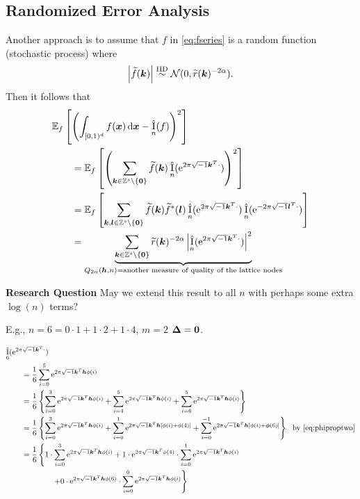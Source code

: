 \documentclass{amsart}
\newcommand{\tr}{\widetilde{r}}
\newcommand{\appxintn}{\appxint_n}
\DeclareMathOperator{\appxint}{\hat{I}}
\begin{document}
\subsection{Randomized Error Analysis}
Another approach is to assume that $f$ in \eqref{eq:fseries} is a random function (stochastic process) where
\begin{equation}
    \abs{\tf(\vk)} \IIDsim \cn(0,\tr(\vk)^{-2\alpha}).
\end{equation}
Then it follows that
\begin{align*}
    \MoveEqLeft{\Ex_f\left[\left(\int_{[0,1)^d} f(\vx) \, \dif \vx - \appxintn(f) \right)^2\right]} \\
    & =
    \Ex_f\left[\left(\sum_{\vk \in \integers^s \setminus\{\vzero\}} \tf(\vk) \appxintn(\me^{2 \pi \sqrt{-1} \vk^T \cdot})\right)^2\right] \\
     & =
    \Ex_f\left[\sum_{\vk,\vl \in \integers^s \setminus\{\vzero\}} \tf(\vk) \tf^*(\vl) \appxintn(\me^{2 \pi \sqrt{-1} \vk^T \cdot}) \appxintn(\me^{-2 \pi \sqrt{-1} \vl^T \cdot})\right] \\
    & = \underbrace{\sum_{\vk\in \integers^s \setminus\{\vzero\}} \tr(\vk)^{-2\alpha} \abs{\appxintn(\me^{2 \pi \sqrt{-1} \vk^T \cdot})}^2}_{Q_{2\alpha}(\vh,n) = \text{another measure of quality of the lattice nodes}}  \\
\end{align*}

\textbf{Research Question}  May we extend this result to all $n$ with perhaps some extra $\log(n)$ terms?

E.g.,  $n =6 = 0\cdot 1 + 1 \cdot 2 + 1 \cdot 4$, $m = 2$ $\boldsymbol{\Delta} = \boldsymbol{0}$.

\begin{align*}
   \MoveEqLeft{\appxint_{6}(\me^{2 \pi \sqrt{-1} \vk^T \cdot})}\\
    &= \frac 1{6} \sum_{i=0}^{5} \me^{2 \pi \sqrt{-1} \vk^T \vh\phi(i)} \\
    &= \frac {1}{6} \left\{ \sum_{i=0}^3 \me^{2 \pi \sqrt{-1} \vk^T \vh\phi(i)} + \sum_{i=4}^5 \me^{2 \pi \sqrt{-1} \vk^T \vh\phi(i)} + \sum_{i=6}^5 \me^{2 \pi \sqrt{-1} \vk^T \vh\phi(i)}  \right\} \\
    &= \frac {1}{6} \left\{ \sum_{i=0}^3 \me^{2 \pi \sqrt{-1} \vk^T \vh\phi(i)} + \sum_{i=0}^1 \me^{2 \pi \sqrt{-1} \vk^T \vh[\phi(i)+\phi(4)]} + \sum_{i=0}^{-1} \me^{2 \pi \sqrt{-1} \vk^T \vh[\phi(i)+\vphi(6)]}  \right\} \ \ \text{by \eqref{eq:phiproptwo}} \\
    &= \frac {1}{6} \left\{ 1\cdot\sum_{i=0}^{3}\me^{2 \pi \sqrt{-1} \vk^T \vh\phi(i)} + 1 \cdot \me^{2 \pi \sqrt{-1} \vk^T \phi(4)} \cdot \sum_{i=0}^{1}\me^{2 \pi \sqrt{-1} \vk^T \vh\phi(i)} \right . \\
    & \qquad \qquad \left . +  0 \cdot
    \me^{2 \pi \sqrt{-1} \vk^T \vh\phi(6)} \cdot \sum_{i=0}^{0}\me^{2 \pi \sqrt{-1} \vk^T \vh\phi(i)} \right\}
\end{align*}
\end{document}
